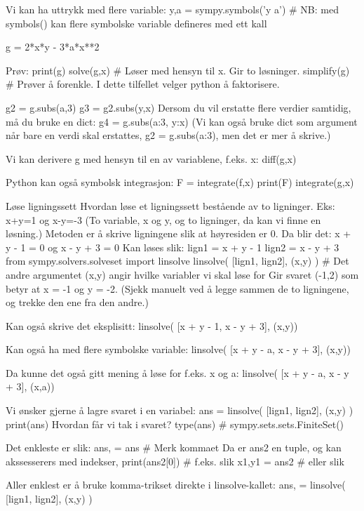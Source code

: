 \documentclass[a4paper,11pt,utf8]{book}
\begin{document}
Vi kan ha uttrykk med flere variable: 
y,a = sympy.symbols('y a')    # NB: med symbols() kan flere symbolske variable defineres med ett kall 

g = 2*x*y - 3*a*x**2

Prøv:
print(g)
solve(g,x)        # Løser med hensyn til x. Gir to løsninger. 
simplify(g)       # Prøver å forenkle. I dette tilfellet velger python å faktorisere. 

g2 = g.subs(a,3)
g3 = g2.subs(y,x)
Dersom du vil erstatte flere verdier samtidig, må du bruke en dict: 
g4 = g.subs({a:3, y:x})
(Vi kan også bruke dict som argument når bare en verdi skal erstattes, g2 = g.subs({a:3}), men det er mer å skrive.) 


Vi kan derivere g med hensyn til en av variablene, f.eks. x:
diff(g,x)


Python kan også symbolsk integrasjon:
F = integrate(f,x) 
print(F)
integrate(g,x)




Løse ligningssett 
Hvordan løse et ligningssett bestående av to ligninger.
Eks: x+y=1 og x-y=-3
(To variable, x og y, og to ligninger, da kan vi finne en løsning.)
Metoden er å skrive ligningene slik at høyresiden er 0.
Da blir det:
x + y - 1 = 0  og  x - y + 3 = 0
Kan løses slik:
lign1 = x + y - 1
lign2 = x - y + 3
from sympy.solvers.solveset import linsolve
linsolve( [lign1, lign2], (x,y) )     # Det andre argumentet (x,y) angir hvilke variabler vi skal løse for
Gir svaret {(-1,2)} som betyr at x = -1 og y = -2.
(Sjekk manuelt ved å legge sammen de to ligningene, og trekke den ene fra den andre.) 

Kan også skrive det eksplisitt:
linsolve( [x + y - 1, x - y + 3], (x,y))

Kan også ha med flere symbolske variable: 
linsolve( [x + y - a, x - y + 3], (x,y))

Da kunne det også gitt mening å løse for f.eks. x og a:
linsolve( [x + y - a, x - y + 3], (x,a))



Vi ønsker gjerne å lagre svaret i en variabel:
ans = linsolve( [lign1, lign2], (x,y) )  
print(ans)
Hvordan får vi tak i svaret?
type(ans)     # sympy.sets.sets.FiniteSet()

Det enkleste er slik:
ans, = ans    # Merk kommaet
Da er ans2 en tuple, og kan akssesserers med indekser,
print(ans2[0])  # f.eks. slik
x1,y1 = ans2    # eller slik 

Aller enklest er å bruke komma-trikset direkte i linsolve-kallet: 
ans, = linsolve( [lign1, lign2], (x,y) )  
\end{document}

